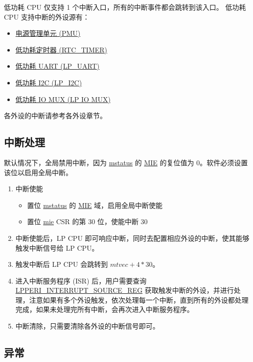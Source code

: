 \documentclass[main\_\_CN.tex]{subfiles}
\begin{document}
\chipname{} 低功耗 CPU 仅支持 1 个中断入口，所有的中断事件都会跳转到该入口。\chipname{} 低功耗 CPU 支持中断的外设源有：
\begin{itemize}
    \item \hyperref[mod:lowpowm]{电源管理单元 (PMU)}
    \item \hyperref[mod:lowpowm]{低功耗定时器 (RTC\_TIMER)}
    \item \hyperref[mod:uart]{低功耗 UART (LP\_UART)}
    \item \hyperref[mod:i2c]{低功耗 I2C (LP\_I2C)}
    \item \hyperref[mod:iomuxgpio]{低功耗 IO MUX (LP IO MUX)}
\end{itemize}

各外设的中断请参考各外设章节。

\subsection{中断处理}

默认情况下，全局禁用中断，因为 \hyperref[regdesc:LPMSTATUS]{mstatus} 的 \hyperref[fielddesc:LPMSTATUSMIE]{MIE} 的复位值为 0。软件必须设置该位以启用全局中断。

\begin{enumerate}
    \item 中断使能
        \begin{itemize}
            \item 置位 \hyperref[regdesc:LPMSTATUS]{mstatus} 的 \hyperref[fielddesc:LPMSTATUSMIE]{MIE} 域，启用全局中断使能
            \item 置位 \hyperref[regdesc:LPMIE]{mie} CSR 的第 30 位，使能中断 30
        \end{itemize}
    \item 中断使能后，LP CPU 即可响应中断，同时去配置相应外设的中断，使其能够触发中断信号给 LP CPU。
    \item 触发中断后 LP CPU 会跳转到 $mtvec + 4*30$。
    \item 进入中断服务程序 (ISR) 后，用户需要查询 \hyperref[regdesc:LPPERIINTERRUPTSOURCEREG]{LPPERI\_INTERRUPT\_SOURCE\_REG} 获取触发中断的外设，并进行处理，注意如果有多个外设触发，依次处理每一个中断，直到所有的外设都处理完成，如果未处理完所有中断，会再次进入中断服务程序。
    \item 中断清除，只需要清除各外设的中断信号即可。
\end{enumerate}

\subsection{异常}
\end{document}
